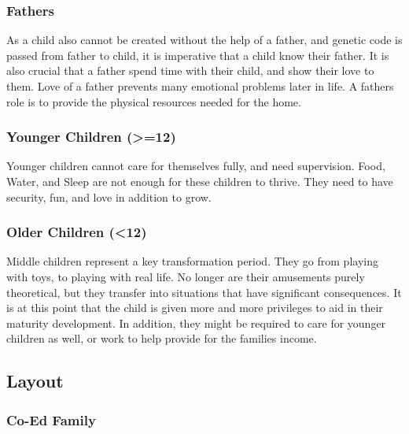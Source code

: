 \documentclass[CSHFoundation.tex]{subfiles}
\begin{document}
\subsubsection{Fathers}



As a child also cannot be created without the help of a father, and genetic code is passed from father to child, it is imperative that a child know their father. It is also crucial that a father spend time with their child, and show their love to them. Love of a father prevents many emotional problems later in life. A fathers role is to provide the physical resources needed for the home.



\subsubsection{Younger Children (\textgreater{}=12)}



Younger children cannot care for themselves fully, and need supervision. Food, Water, and Sleep are not enough for these children to thrive. They need to have security, fun, and love in addition to grow.



\subsubsection{Older Children (\textless{}12)}



Middle children represent a key transformation period. They go from playing with toys, to playing with real life. No longer are their amusements purely theoretical, but they transfer into situations that have significant consequences. It is at this point that the child is given more and more privileges to aid in their maturity development. In addition, they might be required to care for younger children as well, or work to help provide for the families income.



\subsection{Layout}



\subsubsection{Co-Ed Family}
\end{document}
